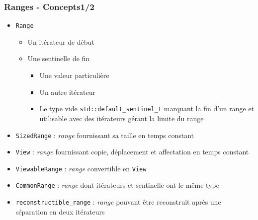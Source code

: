 \documentclass[C++.tex]{subfiles}
\begin{document}
\begin{frame}[fragile]
	\frametitle{Ranges - Concepts\titlehfill{}1/2}
	\begin{itemize}
		\item \lstinline|Range|
		\begin{itemize}
			\item Un itérateur de début
			\item Une sentinelle de fin
			\begin{itemize}
				\item Une valeur particulière
				\item Un autre itérateur


				\item Le type vide \lstinline|std::default_sentinel_t| marquant la fin d'un range et utilisable avec des itérateurs gérant la limite du range

			\end{itemize}
		\end{itemize}

		\item \lstinline|SizedRange| : \textit{range} fournissant sa taille en temps constant
		\item \lstinline|View| : \textit{range} fournissant copie, déplacement et affectation en temps constant
		\item \lstinline|ViewableRange| : \textit{range} convertible en \lstinline|View|
		\item \lstinline|CommonRange| : \textit{range} dont itérateurs et sentinelle ont le même type
		\item \lstinline|reconstructible_range| : \textit{range} pouvant être reconstruit après une séparation en deux itérateurs
	\end{itemize}
\end{frame}
\end{document}
